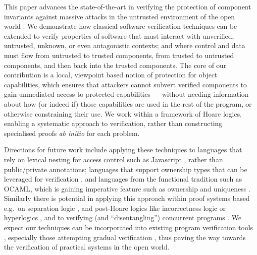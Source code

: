 
This paper advances the state-of-the-art in verifying the protection
of component invariants against massive
attacks \cite{massive-attack-protection} in the untrusted environment
of the open world \cite{baresi2006toward,swapsies}.
%
We demonstrate how classical software verification techniques
can be extended to verify properties of software that must
interact with unverified, untrusted, unknown, or even antagonistic
contexts; and where control and data must flow from untrusted to
trusted components, from trusted to untrusted components, and then
back into the trusted components.
%
The core of our contribution is a local, viewpoint based notion of
protection for object capabilities, which ensures that attackers
cannot subvert verified components to gain unmediated access to
protected capabilities --- without needing information about how (or
indeed if) those capabilities are used in the rest of the program, or
otherwise constraining their use.  We work within a framework of Hoare
logics, enabling a systematic approach to
verification, rather than constructing specialised proofs \textit{ab
initio} for each problem. 


Directions for future work include applying these techniques to
languages that rely on lexical nesting for access
control such as Javascript \cite{ooToSecurity},
rather than public/private annotations;
languages that support ownership types that can be leveraged for
verification
\cite{leveragingRust-oopsla2019,RustHornBelt-pldi2022,verus-oopsla2023},
and languages from the
functional tradition such as OCAML, which is gaining imperative
feature such as ownership and uniqueness \cite{funk-ownership-oopsla2024,ocaml-ownership-icfp2024}. 
%
Similarly there is potential in applying this approach within
proof systems based e.g.\ on separation logic \cite{cerise-jacm2024},
and post-Hoare logics like incorrectness logic \cite{IncorrectnessLogic} or
hyperlogics \cite{compositional-hypersafety-oopsla2022,hyper-hoare-pldi2024},
and to verifying (and ``disentangling'') concurrent programs \cite{seplog-disentanglelment-popl2024}.
%
We expect our techniques can be incorporated into existing program
verification tools \cite{Cok2022}, especially those attempting
gradual verification \cite{gradual-verification-popl2024},
thus paving the way towards the verification of
practical systems in the open world.






